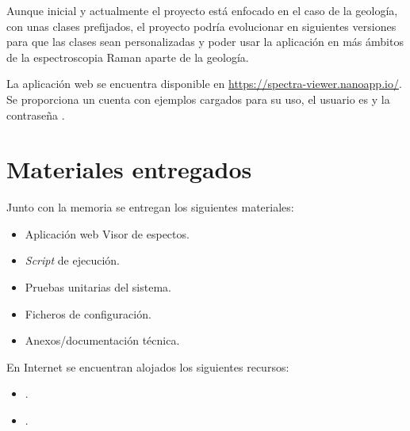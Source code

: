Aunque inicial y actualmente el proyecto está enfocado en el caso de la
geología, con unas clases prefijados, el proyecto podría evolucionar en
siguientes versiones para que las clases sean personalizadas y poder usar la
aplicación en más ámbitos de la espectroscopia Raman aparte de la geología.

La aplicación web se encuentra disponible en \url{https://spectra-viewer.nanoapp.io/}. 
Se proporciona un cuenta con ejemplos cargados para su uso, el usuario es
 y la contraseña .

\section{Materiales entregados}

Junto con la memoria se entregan los siguientes materiales:
\begin{itemize}
	\tightlist	
	\item Aplicación web Visor de espectos.
	\item \textit{Script} de ejecución.
	\item Pruebas unitarias del sistema.
	\item Ficheros de configuración.
	\item Anexos/documentación técnica.
\end{itemize}
En Internet se encuentran alojados los siguientes recursos:
\begin{itemize}
	\tightlist	
	\item {}.
	\item {}.
\end{itemize}
